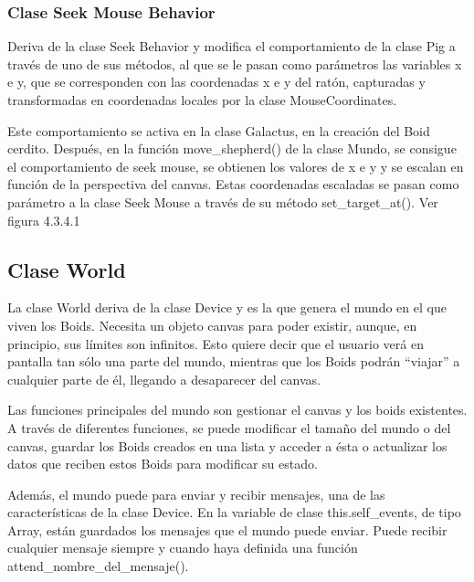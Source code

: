 \subsubsection{Clase Seek Mouse Behavior}
\label{subsubsection:seek_mouse_behavior}

Deriva de la clase Seek Behavior y modifica el comportamiento de la clase Pig a través de uno de sus métodos, al que se le pasan 
como parámetros las variables x e y, que se corresponden  con las coordenadas x e y del ratón, capturadas y transformadas en coordenadas 
locales por la clase MouseCoordinates.

Este comportamiento se activa en la clase Galactus, en la creación del Boid cerdito. Después, en la función move\_shepherd() de la clase 
Mundo, se consigue el comportamiento de seek mouse, se obtienen los valores de x e y y se escalan en función de la perspectiva del canvas.
Estas coordenadas escaladas se pasan como parámetro a la clase Seek Mouse a través de su método  set\_target\_at(). Ver figura 4.3.4.1\\



\subsection{Clase World}
\label{subsection:world}

La clase World deriva de la clase Device y es la que genera el mundo en el que viven los Boids. Necesita un objeto canvas para poder 
existir, aunque, en principio, sus límites son infinitos. Esto quiere decir que el usuario verá en pantalla tan sólo una parte del mundo, 
mientras que los Boids podrán “viajar” a cualquier parte de él, llegando a desaparecer del canvas.

Las funciones principales del mundo son gestionar el canvas y los boids existentes. A través de diferentes funciones, se puede modificar 
el tamaño del mundo o del canvas, guardar los Boids creados en una lista y acceder a ésta o actualizar los datos que reciben estos Boids 
para modificar su estado.

Además, el mundo puede para enviar y recibir mensajes, una de las características de la clase Device. En la variable de clase 
this.self\_events, de tipo Array, están guardados los mensajes que el mundo puede enviar. Puede recibir cualquier mensaje siempre y cuando
haya definida una función attend\_nombre\_del\_mensaje().\\

